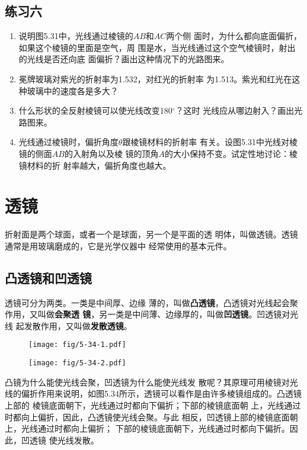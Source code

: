 \subsection*{练习六}
\begin{enumerate}
    \item 说明图5.31中，光线通过棱镜的$AB$和$AC$两个侧
面时，为什么都向底面偏折，如果这个棱镜的里面是空气，周
围是水，当光线通过这个空气棱镜时，射出的光线是否还向底
面偏折？画出这种情况下的光路图来。
\item 冕牌玻璃对紫光的折射率为1.532，对红光的折射率
为1.513。紫光和红光在这种玻璃中的速度各是多大？
\item 什么形状的全反射棱镜可以使光线改变180$^\circ$？这时
光线应从哪边射入？画出光路图来。
\item 光线通过棱镜时，偏折角度$\theta$跟棱镜材料的折射率
有关。设图5.31中光线对棱镜的侧面$AB$的入射角以及棱
镜的顶角$A$的大小保持不变。试定性地讨论：棱镜材料的折
射率越大，偏折角度也越大。
\end{enumerate}

\section{透镜}
折射面是两个球面，或者一个是球面，另一个是平面的透
明体，叫做透镜。透镜通常是用玻璃磨成的，它是光学仪器中
经常使用的基本元件。

\subsection{凸透镜和凹透镜}

透镜可分为两类。一类是中间厚、边缘
薄的，叫做\textbf{凸透镜}，凸透镜对光线起会聚作用，又叫做\textbf{会聚透
镜}，另一类是中间薄、边缘厚的，叫做\textbf{凹透镜}。凹透镜对光线
起发散作用，又叫做\textbf{发散透镜}。
\begin{figure}[htp]
    \centering
    \begin{minipage}[t]{0.48\textwidth}
    \centering
    \texttt{[image: fig/5-34-1.pdf]}
    \end{minipage}
    \begin{minipage}[t]{0.48\textwidth}
    \centering
    \texttt{[image: fig/5-34-2.pdf]}
    \end{minipage}
    \caption{}
    \end{figure}


凸镜为什么能使光线会聚，凹透镜为什么能使光线发
散呢？其原理可用棱镜对光线的偏折作用来说明，如图5.34所示，透镜可以看作是由许多棱镜组成的。凸透镜上部的
棱镜底面朝下，光线通过时都向下偏折；下部的棱镜底面朝
上，光线通过时都向上偏折，因此，凸透镜使光线会聚。与此
相反，凹透镜上部的棱镜底面朝上，光线通过时都向上偏折；
下部的棱镜底面朝下，光线通过时都向下偏折。因此，凹透镜
使光线发散。

